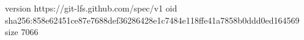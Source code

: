 version https://git-lfs.github.com/spec/v1
oid sha256:858e62451ce87e7688def36286428e1c7484e118ffe41a7858b0ddd0ed164569
size 7066
